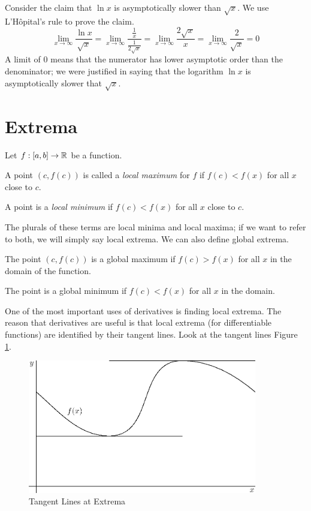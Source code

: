 \documentclass[fleqn]{report}
\begin{document}
\begin{example}
Consider  the claim that
$\ln x$ is asymptotically slower than $\sqrt{x}$. We use
L'H\^opital's rule to prove the claim.
\begin{equation*}
\lim_{x \rightarrow \infty} \frac{\ln x}{\sqrt{x}} = \lim_{x
\rightarrow \infty} \frac{\frac{1}{x}}{\frac{1}{2\sqrt{x}}} =
\lim_{x \rightarrow \infty} \frac{2 \sqrt{x}}{x} = \lim_{x
\rightarrow \infty} \frac{2}{\sqrt{x}} = 0
\end{equation*}
A limit of $0$ means that the numerator has lower
asymptotic order than the denominator; we were justified in
saying that the logarithm $\ln x$ is asymptotically slower
that $\sqrt{x}$. 
\end{example}

\section{Extrema}
\label{extrema}

Let $f: [a,b] \rightarrow \mathbb{R}$ be a function. 
\begin{smallitemize}
\item A point $(c,f(c))$ is called a \emph{local maximum} for
$f$ if $f(c) < f(x)$ for all $x$ close to $c$. 
\item A point is a \emph{local minimum} if $f(c) < f(x)$ for
all $x$ close to $c$. 
\end{smallitemize} 
The plurals of these terms are local minima and local maxima;
if we want to refer to both, we will simply say local extrema.
We can also define global extrema. 
\begin{smallitemize}
\item The point $(c,f(c))$ is a
global maximum if $f(c) > f(x)$ for all $x$ in the domain of
the function. 
\item The point is a global minimum if $f(c) < f(x)$
for all $x$ in the domain. 
\end{smallitemize}
One of the most important uses of derivatives is finding local
extrema. The reason that derivatives are useful is that local
extrema (for differentiable functions) are identified by their
tangent lines. Look at the tangent lines Figure
\ref{figure-tangent-lines-at-extrema}. 

\begin{figure}[t]
\centering
\includegraphics[width=10cm]{figure54.eps}
\caption{Tangent Lines at Extrema}
\label{figure-tangent-lines-at-extrema}
\end{figure}
\end{document}
